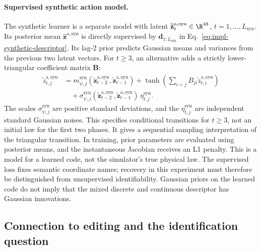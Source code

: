 \paragraph{Supervised synthetic action model.}
The synthetic learner is a separate model with latent
$\widetilde{\mathbf z}^{\mathrm a,\mathrm{syn}}_t\in\R^{48}$, $t=1,\ldots,L_{\mathrm{syn}}$.
Its posterior mean $\widehat{\mathbf z}^{\mathrm a,\mathrm{syn}}$ is directly supervised by $\mathbf d_{1:L_{\mathrm{syn}}}$ in
Eq.~\ref{eq:impl-synthetic-descriptor}.
Its lag-2 prior predicts Gaussian means and variances from the previous
two latent vectors. For $t\geq3$, an alternative adds a strictly
lower-triangular coefficient matrix $\mathbf B$:
\begin{equation}
 \begin{aligned}
  \widetilde z^{\mathrm a,\mathrm{syn}}_{t,j}
   &=m^{\mathrm{syn}}_{\psi,j}(\widetilde{\mathbf z}^{\mathrm a,\mathrm{syn}}_{t-2},\widetilde{\mathbf z}^{\mathrm a,\mathrm{syn}}_{t-1})
     +\tanh\!\left(\sum_{i<j}B_{ji}\widetilde z^{\mathrm a,\mathrm{syn}}_{t,i}\right)\\
   &\quad+\sigma^{\mathrm{syn}}_{\psi,j}
       (\widetilde{\mathbf z}^{\mathrm a,\mathrm{syn}}_{t-2},\widetilde{\mathbf z}^{\mathrm a,\mathrm{syn}}_{t-1})\,\eta^{\mathrm{syn}}_{t,j}.
 \end{aligned}
 \label{eq:impl-synthetic-prior}
\end{equation}
The scales
$\sigma^{\mathrm{syn}}_{\psi,j}$ are positive standard deviations, and the
$\eta^{\mathrm{syn}}_{t,j}$ are independent standard Gaussian noises.
This specifies conditional transitions for $t\geq3$, not an initial law
for the first two phases. It gives a sequential sampling interpretation
of the triangular transition. In training, prior parameters are evaluated
using posterior means, and the instantaneous Jacobian receives an L1 penalty.
This is a model for a learned code, not the simulator's true physical law.
The supervised loss fixes semantic coordinate names; recovery in this
experiment must therefore be distinguished from unsupervised
identifiability. Gaussian priors on the learned code do not imply that
the mixed discrete and continuous descriptor has Gaussian innovations.

\subsection{Connection to editing and the identification question}
\label{subsec:impl-editing-evidence}

